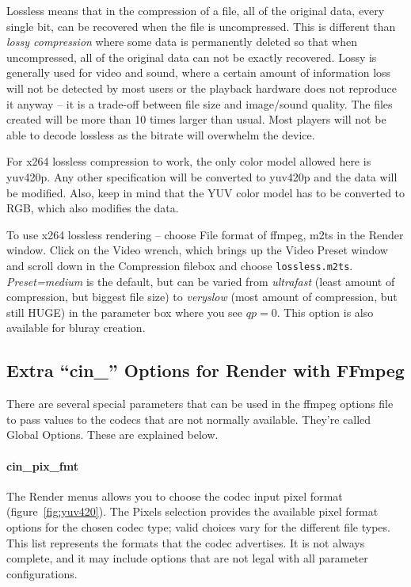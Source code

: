 Lossless means that in the compression of a file, all of the
original data, every single bit, can be recovered when the file is
uncompressed.  This is different than \textit{lossy compression}
where some data is permanently deleted so that when uncompressed,
all of the original data can not be exactly recovered.  Lossy is
generally used for video and sound, where a certain amount of
information loss will not be detected by most users or the playback
hardware does not reproduce it anyway -- it is a trade-off between
file size and image/sound quality.  The files created will be more
than 10 times larger than usual.  Most players will not be able to
decode lossless as the bitrate will overwhelm the device.

For x264 lossless compression to work, the only color model allowed
here is yuv420p.  Any other specification will be converted to
yuv420p and the data will be modified.  Also, keep in mind that the
YUV color model has to be converted to RGB, which also modifies the
data.

To use x264 lossless rendering -- choose File format of ffmpeg, m2ts
in the Render window.  Click on the Video wrench, which brings up
the Video Preset window and scroll down in the Compression filebox
and choose \texttt{lossless.m2ts}.  \textit{Preset=medium} is the
default, but can be varied from \textit{ultrafast} (least amount of
compression, but biggest file size) to \textit{veryslow} (most
amount of compression, but still HUGE) in the parameter box where
you see $qp=0$.  This option is also available for bluray creation.

\subsection{Extra “cin\_” Options for Render with FFmpeg}%
\label{sub:extra_cin_option_ffmpeg}

There are several special parameters that can be used in the ffmpeg
options file to pass values to the codecs that are not normally
available.  They're called Global Options. These are explained
below.

\paragraph{cin\_pix\_fmt} The Render menus allows you to choose the
codec input pixel format (figure~\ref{fig:yuv420}).  The Pixels
selection provides the available pixel format options for the chosen
codec type; valid choices vary for the different file types.  This
list represents the formats that the codec advertises.  It is not
always complete, and it may include options that are not legal with
all parameter configurations.

